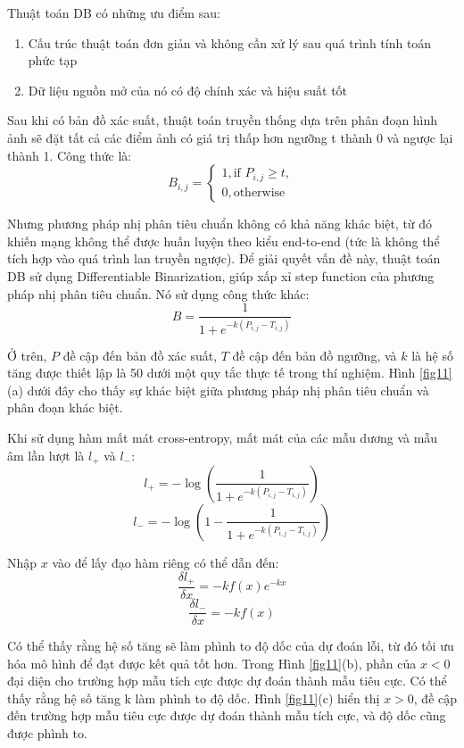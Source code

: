 Thuật toán DB có những ưu điểm sau:
\begin{enumerate}
    \item Cấu trúc thuật toán đơn giản và không cần xử lý sau quá trình tính toán phức tạp
    \item Dữ liệu nguồn mở của nó có độ chính xác và hiệu suất tốt
\end{enumerate}
Sau khi có bản đồ xác suất, thuật toán truyền thống dựa trên phân đoạn hình ảnh sẽ đặt tất cả các điểm ảnh có giá trị thấp hơn ngưỡng t thành 0 và ngược lại thành 1. Công thức là: 
$$
B_{i, j} = \begin{cases}
    1, \text{if } P_{i, j} \geq t, \\
    0, \text{otherwise}
\end{cases} 
$$

Nhưng phương pháp nhị phân tiêu chuẩn không có khả năng khác biệt, từ đó khiến mạng không thể được huấn luyện theo kiểu end-to-end (tức là không thể tích hợp vào quá trình lan truyền ngược). Để giải quyết vấn đề này, thuật toán DB sử dụng Differentiable Binarization, giúp xấp xỉ step function của phương pháp nhị phân tiêu chuẩn. Nó sử dụng công thức khác:
\[
    \hat{B} = \frac{1}{1+e^{-k(P_{i, j} - T_{i, j})}}    
\]

Ở trên, $P$ đề cập đến bản đồ xác suất, $T$ đề cập đến bản đồ ngưỡng, và $k$ là hệ số tăng được thiết lập là 50 dưới một quy tắc thực tế trong thí nghiệm. Hình \ref{fig11}(a) dưới đây cho thấy sự khác biệt giữa phương pháp nhị phân tiêu chuẩn và phân đoạn khác biệt.

Khi sử dụng hàm mất mát cross-entropy, mất mát của các mẫu dương và mẫu âm lần lượt là $l_+$ và $l_-$:
\[
    l_+ = -\log(\frac{1}{1+e^{-k(P_{i, j}-T_{i, j})}})
\]
\[
    l_- = -\log(1 - \frac{1}{1 + e^{-k(P_{i, j} - T_{i, j})}})
\]

Nhập $x$ vào để lấy đạo hàm riêng có thể dẫn đến:
\[
    \frac{\delta l_+}{\delta x} = -kf(x)e^{-kx}
\]
\[
    \frac{\delta l_-}{\delta x} = -kf(x)   
\]

Có thể thấy rằng hệ số tăng sẽ làm phình to độ dốc của dự đoán lỗi, từ đó tối ưu hóa mô hình để đạt được kết quả tốt hơn. Trong Hình \ref{fig11}(b), phần của $x < 0$ đại diện cho trường hợp mẫu tích cực được dự đoán thành mẫu tiêu cực. Có thể thấy rằng hệ số tăng k làm phình to độ dốc. Hình \ref{fig11}(c) hiển thị $x > 0$, đề cập đến trường hợp mẫu tiêu cực được dự đoán thành mẫu tích cực, và độ dốc cũng được phình to.

